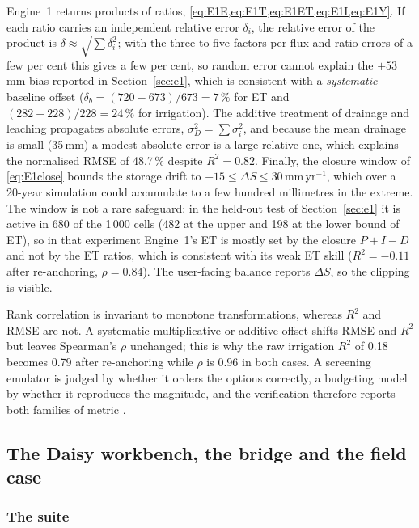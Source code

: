 \documentclass[preprint,12pt]{elsarticle}
\begin{document}
Engine~1 returns products of ratios, \cref{eq:E1E,eq:E1T,eq:E1ET,eq:E1I,eq:E1Y}. If each ratio carries an independent relative error $\delta_i$, the relative error of the product is $\delta\approx\sqrt{\sum\delta_i^2}$; with the three to five factors per flux and ratio errors of a few per cent this gives a few per cent, so random error cannot explain the $+53$\,mm bias reported in Section~\ref{sec:e1}, which is consistent with a \emph{systematic} baseline offset ($\delta_b=(720-673)/673=7\,\%$ for ET and $(282-228)/228=24\,\%$ for irrigation). The additive treatment of drainage and leaching propagates absolute errors, $\sigma_D^2=\sum\sigma_i^2$, and because the mean drainage is small (35\,mm) a modest absolute error is a large relative one, which explains the normalised RMSE of 48.7\,\% despite $R^2=0.82$. Finally, the closure window of \cref{eq:E1close} bounds the storage drift to $-15\le\Delta S\le30$\,mm\,yr$^{-1}$, which over a 20-year simulation could accumulate to a few hundred millimetres in the extreme. The window is not a rare safeguard: in the held-out test of Section~\ref{sec:e1} it is active in 680 of the 1\,000 cells (482 at the upper and 198 at the lower bound of ET), so in that experiment Engine~1's ET is mostly set by the closure $P+I-D$ and not by the ET ratios, which is consistent with its weak ET skill ($R^2=-0.11$ after re-anchoring, $\rho=0.84$). The user-facing balance reports $\Delta S$, so the clipping is visible.

Rank correlation is invariant to monotone transformations, whereas $R^2$ and RMSE are not. A systematic multiplicative or additive offset shifts RMSE and $R^2$ but leaves Spearman's $\rho$ unchanged; this is why the raw irrigation $R^2$ of 0.18 becomes 0.79 after re-anchoring while $\rho$ is 0.96 in both cases. A screening emulator is judged by whether it orders the options correctly, a budgeting model by whether it reproduces the magnitude, and the verification therefore reports both families of metric \cite{Moriasi2007,Bennett2013}.




\subsection{The Daisy workbench, the bridge and the field case}\label{sec:wbmethods}

\subsubsection{The suite}
\end{document}

